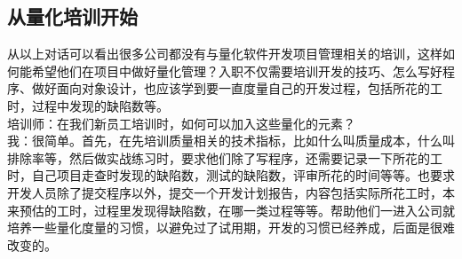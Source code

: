
\hypertarget{ux4eceux91cfux5316ux57f9ux8badux5f00ux59cb}{%
\subsection{从量化培训开始}\label{ux4eceux91cfux5316ux57f9ux8badux5f00ux59cb}}

从以上对话可以看出很多公司都没有与量化软件开发项目管理相关的培训，这样如何能希望他们在项目中做好量化管理？入职不仅需要培训开发的技巧、怎么写好程序、做好面向对象设计，也应该学到要一直度量自己的开发过程，包括所花的工时，过程中发现的缺陷数等。\\
培训师：在我们新员工培训时，如何可以加入这些量化的元素？\\
我：很简单。首先，在先培训质量相关的技术指标，比如什么叫质量成本，什么叫排除率等，然后做实战练习时，要求他们除了写程序，还需要记录一下所花的工时，自己项目走查时发现的缺陷数，测试的缺陷数，评审所花的时间等等。也要求开发人员除了提交程序以外，提交一个开发计划报告，内容包括实际所花工时，本来预估的工时，过程里发现得缺陷数，在哪一类过程等等。帮助他们一进入公司就培养一些量化度量的习惯，以避免过了试用期，开发的习惯已经养成，后面是很难改变的。\\

